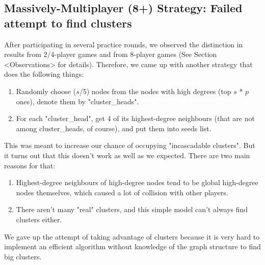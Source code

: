 \documentclass[12pt]{article}
\begin{document}
\subsection{Massively-Multiplayer (8+) Strategy: Failed attempt to find clusters}
After participating in several practice rounds, we observed the distinction in results from 2/4-player games and from 8-player games (See Section <Observations> for details). Therefore, we came up with another strategy that does the following things:
\begin{enumerate}
\item Randomly choose ($s$/5) nodes from the nodes with high degrees (top $s$ * $p$ ones), denote them by "cluster_heads". 
\item For each "cluster_head", get 4 of its highest-degree neighbours (that are not among cluster_heads, of course), and put them into seeds list. 
\end{enumerate}
This was meant to increase our chance of occupying "incascadable clusters". But it turns out that this doesn't work as well as we expected. There are two main reasons for that:
\begin{enumerate}
\item Highest-degree neighbours of high-degree nodes tend to be global high-degree nodes themselves, which caused a lot of collision with other players.
\item There aren't many "real" clusters, and this simple model can't always find clusters either. 
\end{enumerate}
We gave up the attempt of taking advantage of clusters because it is very hard to implement an efficient algorithm without knowledge of the graph structure to find big clusters.  
\end{document}
